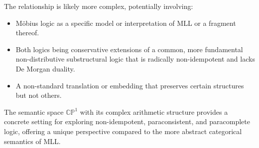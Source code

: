 	The relationship is likely more complex, potentially involving:
	\begin{itemize}
		\item M\"{o}bius logic as a specific model or interpretation of MLL or a fragment thereof.
		\item Both logics being conservative extensions of a common, more fundamental non-distributive substructural logic that is radically non-idempotent and lacks De Morgan duality.
		\item A non-standard translation or embedding that preserves certain structures but not others.
	\end{itemize}
	The semantic space $\mathbb{CP}^1$ with its complex arithmetic structure provides a concrete setting for exploring non-idempotent, paraconsistent, and paracomplete logic, offering a unique perspective compared to the more abstract categorical semantics of MLL.
